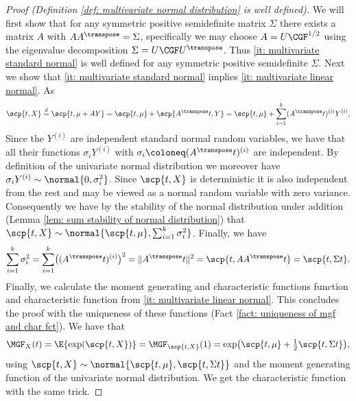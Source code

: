 \begin{proof}[Proof (Definition \ref{def: multivariate normal distribution} is well defined)]
    We will first show that for any symmetric positive semidefinite matrix \(\Sigma\)
    there exists a matrix \(A\) with \(A A^\transpose = \Sigma\),
    specifically we may choose \(A = U \CGF^{1/2}\) using the
    eigenvalue decomposition \(\Sigma = U \CGF U^\transpose\).
    Thus \ref{it: multivariate standard normal} is well defined for
    any symmetric positive semidefinite \(\Sigma\).
    Next we show that \ref{it: multivariate standard normal} implies 
    \ref{it: multivariate linear normal}. As
    \[
        \scp{t, X}
        \overset{d}= \scp{t, \mu + A Y}
        = \scp{t, \mu} + \scp{A^\transpose t, Y}
        = \scp{t, \mu} + \sum_{i=1}^k (A^\transpose t)^{(i)} Y^{(i)},
    \]
    Since the \(Y^{(i)}\) are independent standard normal random variables, we have that
    all their functions \(\sigma_i Y^{(i)}\) with \(\sigma_i \coloneq (A^\transpose t)^{(i)}\)
    are independent. By definition of the univariate normal distribution
    we moreover have \(\sigma_i Y^{(i)} \sim \normal{0, \sigma_i^2}\). Since
    \(\scp{t, X}\) is deterministic it is also independent from the rest and
    may be viewed as a normal random variable with zero variance. Consequently
    we have by the stability of the normal distribution under addition (Lemma \ref{lem: sum stability of normal distribution})
    that \(\scp{t, X} \sim \normal{\scp{t, \mu}, \sum_{i=1}^k \sigma_i^2}\).
    Finally, we have
    \[
        \sum_{i=1}^k \sigma_i^2
        = \sum_{i=1}^k \bigl((A^\transpose t)^{(i)}\bigr)^2
        = \|A^\transpose t\|^2
        = \scp{t, A A^\transpose t}
        = \scp{t, \Sigma t}.
    \]
    Finally, we calculate the moment generating and characteristic functions
    function and characteristic function from \ref{it: multivariate linear
    normal}. This concludes the proof with the uniqueness of these functions
    (Fact \ref{fact: uniqueness of mgf and char fct}). We have that
    \[
        \MGF_X(t) = \E{\exp(\scp{t, X})}
        = \MGF_{\scp{t, X}}(1)
        = \exp\bigl(\scp{t, \mu} + \tfrac12 \scp{t, \Sigma t}\bigr),
    \]
    using \(\scp{t, X} \sim \normal{\scp{t, \mu}, \scp{t, \Sigma t}}\)
    and the moment generating function of the univariate normal distribution.
    We get the characteristic function with the same trick.
\end{proof}

